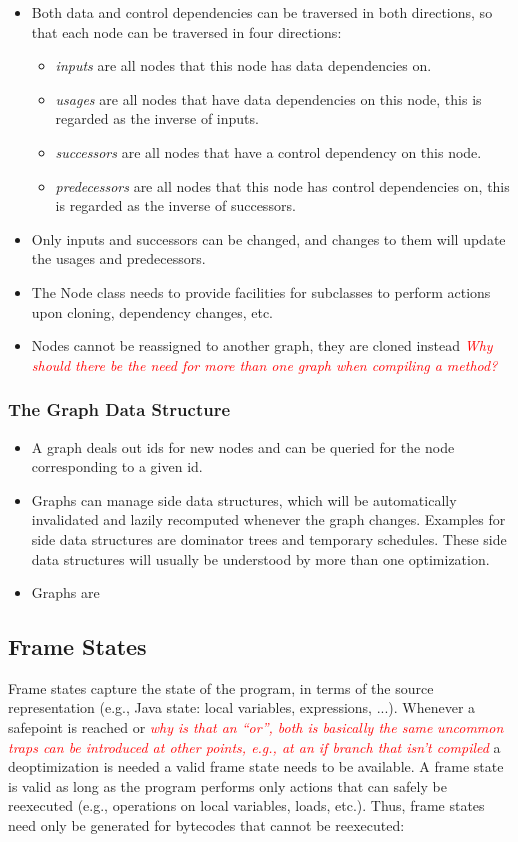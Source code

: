 \documentclass[twocolumn]{svjour3}
\newcommand{\mynote}[2]{
\textcolor{red}{\fbox{\bfseries\sffamily\scriptsize#1}
  {\small\textsf{\emph{#2}}}
\fbox{\bfseries\sffamily\scriptsize }}}
\newcommand\cw[1]{\mynote{CW}{#1}}
\newcommand\ls[1]{\mynote{LS}{#1}}
\begin{document}
\begin{itemize}
    \item Both data and control dependencies can be traversed in both directions, so that each node can be traversed in four directions:
    \begin{itemize}
        \item \emph{inputs} are all nodes that this node has data dependencies on.
        \item \emph{usages} are all nodes that have data dependencies on this node, this is regarded as the inverse of inputs.
        \item \emph{successors} are all nodes that have a control dependency on this node.
        \item \emph{predecessors} are all nodes that this node has control dependencies on, this is regarded as the inverse of successors.
    \end{itemize}
    \item Only inputs and successors can be changed, and changes to them will update the usages and predecessors.
    \item The Node class needs to provide facilities for subclasses to perform actions upon cloning, dependency changes, etc.
    \item Nodes cannot be reassigned to another graph, they are cloned instead \cw{Why should there be the need for more than one graph when compiling a method?}
\end{itemize}

\subsubsection{The Graph Data Structure}
\begin{itemize}
    \item A graph deals out ids for new nodes and can be queried for the node corresponding to a given id.
    \item Graphs can manage side data structures, which will be automatically invalidated and lazily recomputed whenever the graph changes. Examples for side data structures are dominator trees and temporary schedules. These side data structures will usually be understood by more than one optimization.
    \item Graphs are 
\end{itemize}

\subsection{Frame States}
Frame states capture the state of the program, in terms of the source representation (e.g., Java state: local variables, expressions, ...).
Whenever a safepoint is reached or \cw{why is that an ``or'', both is basically the same} \ls{uncommon traps can be introduced at other points, e.g., at an if branch that isn't compiled} a deoptimization is needed a valid frame state needs to be available.
A frame state is valid as long as the program performs only actions that can safely be reexecuted (e.g., operations on local variables, loads, etc.).
Thus, frame states need only be generated for bytecodes that cannot be reexecuted:
\end{document}
